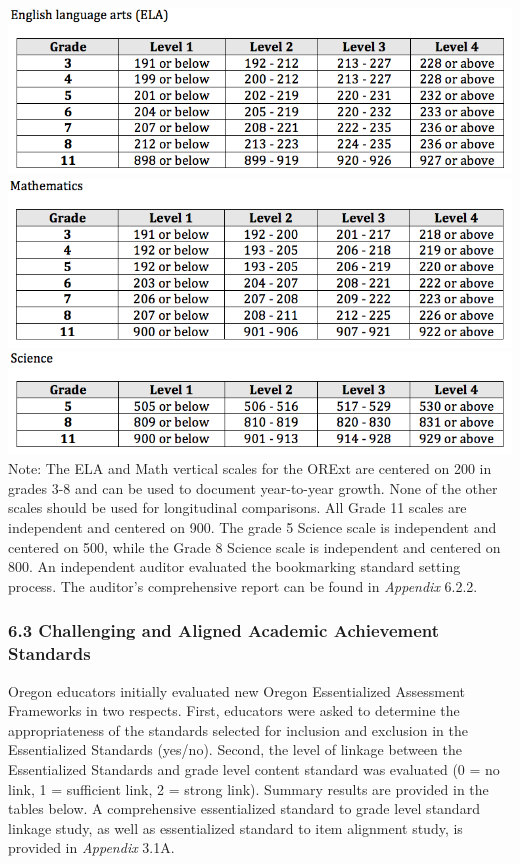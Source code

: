\documentclass[]{article}
\begin{document}
\FloatBarrier
\includegraphics{tifs/elacutscore.png}
\includegraphics{tifs/mathcutscore.png}
\includegraphics{tifs/sciencecutscore.png} Note: The ELA and Math
vertical scales for the ORExt are centered on 200 in grades 3-8 and can
be used to document year-to-year growth. None of the other scales should
be used for longitudinal comparisons. All Grade 11 scales are
independent and centered on 900. The grade 5 Science scale is
independent and centered on 500, while the Grade 8 Science scale is
independent and centered on 800. An independent auditor evaluated the
bookmarking standard setting process. The auditor's comprehensive report
can be found in \emph{Appendix} 6.2.2.

\subsubsection{6.3 Challenging and Aligned Academic Achievement
Standards}\label{challenging-and-aligned-academic-achievement-standards}

Oregon educators initially evaluated new Oregon Essentialized Assessment
Frameworks in two respects. First, educators were asked to determine the
appropriateness of the standards selected for inclusion and exclusion in
the Essentialized Standards (yes/no). Second, the level of linkage
between the Essentialized Standards and grade level content standard was
evaluated (0 = no link, 1 = sufficient link, 2 = strong link). Summary
results are provided in the tables below. A comprehensive essentialized
standard to grade level standard linkage study, as well as essentialized
standard to item alignment study, is provided in \emph{Appendix} 3.1A.
\end{document}
